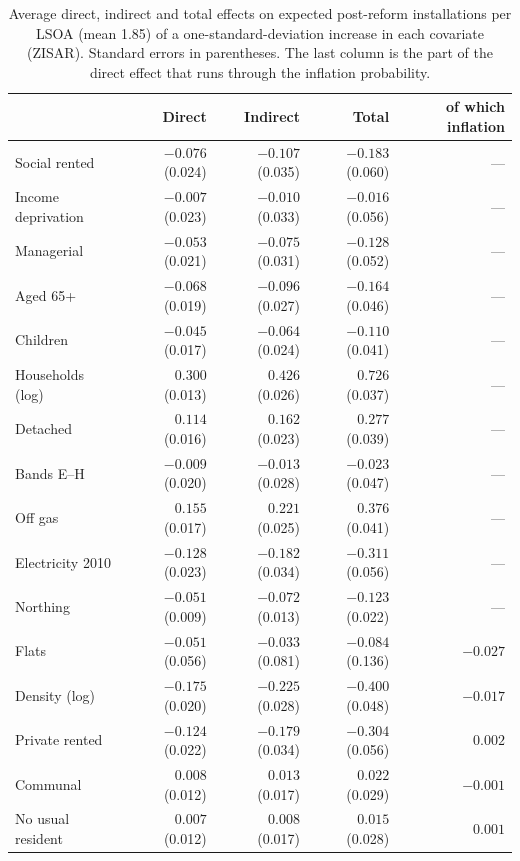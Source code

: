 \begin{table}[htbp]
\centering
\caption{Average direct, indirect and total effects on expected post-reform installations per LSOA (mean 1.85) of a one-standard-deviation increase in each covariate (ZISAR). Standard errors in parentheses. The last column is the part of the direct effect that runs through the inflation probability.}\label{tab:app_effects}
\small
\begin{tabular}{lrrrr}
\toprule
 & Direct & Indirect & Total & of which inflation \\
\midrule
Social rented              & $-0.076$ (0.024) & $-0.107$ (0.035) & $-0.183$ (0.060) & --- \\
Income deprivation         & $-0.007$ (0.023) & $-0.010$ (0.033) & $-0.016$ (0.056) & --- \\
Managerial                 & $-0.053$ (0.021) & $-0.075$ (0.031) & $-0.128$ (0.052) & --- \\
Aged 65+                   & $-0.068$ (0.019) & $-0.096$ (0.027) & $-0.164$ (0.046) & --- \\
Children                   & $-0.045$ (0.017) & $-0.064$ (0.024) & $-0.110$ (0.041) & --- \\
Households (log)           & $0.300$ (0.013) & $0.426$ (0.026) & $0.726$ (0.037) & --- \\
Detached                   & $0.114$ (0.016) & $0.162$ (0.023) & $0.277$ (0.039) & --- \\
Bands E--H                 & $-0.009$ (0.020) & $-0.013$ (0.028) & $-0.023$ (0.047) & --- \\
Off gas                    & $0.155$ (0.017) & $0.221$ (0.025) & $0.376$ (0.041) & --- \\
Electricity 2010           & $-0.128$ (0.023) & $-0.182$ (0.034) & $-0.311$ (0.056) & --- \\
Northing                   & $-0.051$ (0.009) & $-0.072$ (0.013) & $-0.123$ (0.022) & --- \\
Flats                      & $-0.051$ (0.056) & $-0.033$ (0.081) & $-0.084$ (0.136) & $-0.027$ \\
Density (log)              & $-0.175$ (0.020) & $-0.225$ (0.028) & $-0.400$ (0.048) & $-0.017$ \\
Private rented             & $-0.124$ (0.022) & $-0.179$ (0.034) & $-0.304$ (0.056) & $0.002$ \\
Communal                   & $0.008$ (0.012) & $0.013$ (0.017) & $0.022$ (0.029) & $-0.001$ \\
No usual resident          & $0.007$ (0.012) & $0.008$ (0.017) & $0.015$ (0.028) & $0.001$ \\

\end{tabular}
\end{table}
